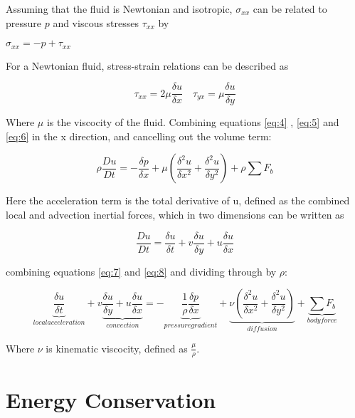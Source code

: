    Assuming that the fluid is Newtonian and isotropic, $\sigma_{xx}$ can be related to pressure $p$ and viscous stresses $\tau_{xx}$ by

    \centerline{$\sigma_{xx} = -p + \tau_{xx}$}

    For a Newtonian fluid, stress-strain relations can be described as 

    \begin{equation} \label{eq:6}
      \tau_{xx} = 2 \mu \frac{\delta u}{\delta x} \quad \tau_{yx} = \mu \frac{\delta u}{\delta y}
    \end{equation}

    Where $\mu$ is the viscocity of the fluid. Combining equations \ref{eq:4} , \ref{eq:5} and \ref{eq:6} in the x direction, and cancelling out the volume term:

    \begin{equation} \label{eq:7}
      \rho \frac{Du}{Dt} = - \frac{\delta p}{\delta x} + \mu (\frac{\delta^2 u}{\delta x^2} + \frac{\delta^2 u}{\delta y^2}) + \rho \sum F_{b}
    \end{equation}
    
    Here the acceleration term is the total derivative of u, defined as the combined local and advection inertial forces, which in two dimensions can be written as

    \begin{equation} \label{eq:8}
      \frac{Du}{Dt} = \frac{\delta u}{\delta t} + v \frac{\delta u}{\delta y} + u \frac{\delta u}{\delta x}
    \end{equation}

    combining equations \ref{eq:7} and \ref{eq:8} and dividing through by $\rho$:

    \begin{equation} \label{eq:8}
      \underbrace{\frac{\delta u}{\delta t}}_{local acceleration} + v \underbrace{\frac{\delta u}{\delta y} + u \frac{\delta u}{\delta x}}_{convection} = - \underbrace{\frac{1}{\rho} \frac{\delta p}{\delta x}}_{pressure gradient} + \underbrace{\nu (\frac{\delta^2 u}{\delta x^2} + \frac{\delta^2 u}{\delta y^2})}_{diffusion} + \underbrace{\sum F_{b}}_{body force}
    \end{equation}

    Where $\nu$ is kinematic viscocity, defined as $\frac{\mu}{\rho}$. 

    \section{Energy Conservation}

